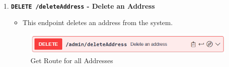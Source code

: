 \begin{enumerate}
        \item \textbf{\texttt{DELETE /deleteAddress} - Delete an Address}
        \begin{itemize}
            \item This endpoint deletes an address from the system.
        \end{itemize} 
        \begin{figure} [H]
            \centering
            \includegraphics [width=1\textwidth] {images/andreas/praxis/deleteAddress.png}
            \caption{Get Route for all Addresses}
        \end{figure}
    \end{enumerate}
    


    


